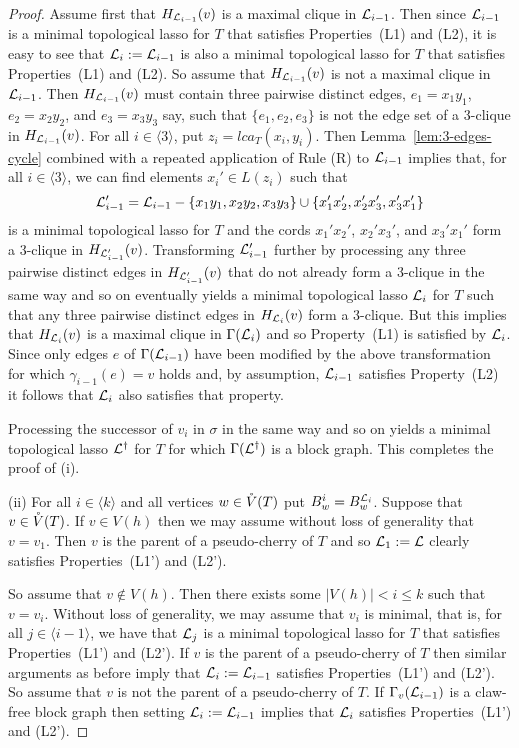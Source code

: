 \begin{proof}
  Assume first that $H_{{\mathcal L}_{i-1}}(v)$ is a maximal clique in
  ${\mathcal L}_{i-1}$. Then since ${\mathcal L}_{i-1}$ is a minimal topological lasso for $T$
  that satisfies Properties~(L1) and (L2), it is easy to see that
  ${\mathcal L}_{i}:={\mathcal L}_{i-1}$ is also a minimal topological lasso for $T$ that
  satisfies Properties~(L1) and (L2).  So assume that $H_{{\mathcal L}_{i-1}}(v)$ is
  not a maximal clique in ${\mathcal L}_{i-1}$.  Then $H_{{\mathcal L}_{i-1}}(v)$ must contain
  three pairwise distinct edges, $e_1=x_1y_1$, $e_2=x_2y_2$, and $e_3=x_3y_3$
  say, such that $\{e_1, e_2,e_3\}$ is not the edge set of a $3$-clique in
  $H_{{\mathcal L}_{i-1}}(v)$.  For all $i\in\langle 3\rangle $, put
  $z_i=lca_T(x_i,y_i)$.  Then Lemma~\ref{lem:3-edges-cycle} combined with a
  repeated application of Rule (R) to ${\mathcal L}_{i-1}$ implies that, for all
  $i\in\langle 3\rangle$, we can find elements $x_i'\in L(z_i)$ such that
  $$
  {\mathcal L}_{i-1}'={\mathcal L}_{i-1}-\{x_1y_1,x_2y_2,x_3y_3\}\cup 
  \{x_1'x_2', x_2'x_3',x_3'x_1'\}
  $$
  is a minimal topological lasso for $T$ and the cords $x_1'x_2'$, $x_2'x_3'$,
  and $x_3'x_1'$ form a $3$-clique in $H_{{\mathcal L}_{i-1}'}(v)$.  Transforming
  ${\mathcal L}_{i-1}'$ further by processing any three pairwise distinct edges in
  $H_{{\mathcal L}_{i-1}'}(v)$ that do not already form a $3$-clique in the same way
  and so on eventually yields a minimal topological lasso ${\mathcal L}_{i}$ for $T$
  such that any three pairwise distinct edges in $H_{{\mathcal L}_{i}}(v)$ form a
  $3$-clique. But this implies that $H_{{\mathcal L}_{i}}(v)$ is a maximal clique in
  $\Gamma({\mathcal L}_{i})$ and so Property~(L1) is satisfied by ${\mathcal L}_i$. Since only
  edges $e$ of $\Gamma({\mathcal L}_{i-1})$ have been modified by the above
  transformation for which $\gamma_{i-1}(e)=v$ holds and, by assumption,
  ${\mathcal L}_{i-1}$ satisfies Property~(L2) it follows that ${\mathcal L}_{i}$ also satisfies
  that property.

  Processing the successor of $v_i$ in $\sigma$ in the same way and so on
  yields a minimal topological lasso ${\mathcal L}^{\dagger}$ for $T$ for which
  $\Gamma({\mathcal L}^{\dagger})$ is a block graph. This completes the proof of (i).


  (ii) For all $i\in \langle k\rangle$ and all vertices $w\in \mathring{V}(T)$ put
  $B^i_w=B^{{\mathcal L}_i}_w$.  Suppose that $v\in \mathring{V}(T)$. If $v\in V(h)$ then we may
  assume without loss of generality that $v=v_1$. Then $v$ is the parent of a
  pseudo-cherry of $T$ and so ${\mathcal L}_1:={\mathcal L}$ clearly satisfies Properties~(L1')
  and (L2').

  So assume that $v\not\in V(h)$. Then there exists some $|V(h)|< i\leq k$
  such that $v=v_i$. Without loss of generality, we may assume that $v_i$ is
  minimal, that is, for all $j\in\langle i-1\rangle$, we have that ${\mathcal L}_j$ is
  a minimal topological lasso for $T$ that satisfies Properties~(L1') and
  (L2'). If $v$ is the parent of a pseudo-cherry of $T$ then similar arguments
  as before imply that ${\mathcal L}_i:={\mathcal L}_{i-1}$ satisfies Properties~(L1') and
  (L2'). So assume that $v$ is not the parent of a pseudo-cherry of $T$.  If
  $\Gamma_v({\mathcal L}_{i-1})$ is a claw-free block graph then setting
  ${\mathcal L}_i:={\mathcal L}_{i-1}$ implies that ${\mathcal L}_i$ satisfies Properties~(L1') and
  (L2').


\end{proof}
